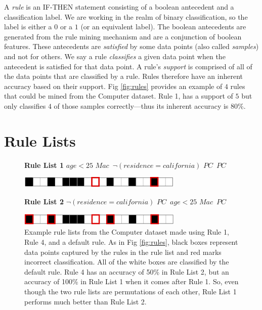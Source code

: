 A \textit{rule} is an IF-THEN statement consisting of a boolean antecedent and a classification label.
We are working in the realm of binary classification, so the label is either a $0$ or a $1$ (or an equivalent label).
The boolean antecedents are generated from the rule mining mechanism \cite{LethamRuMcMa15} and are a conjunction of boolean features.
These antecedents are \textit{satisfied} by some data points (also called \textit{samples}) and not for others.
We say a rule \textit{classifies} a given data point when the antecedent is satisfied for that data point.
A rule's \textit{support} is comprised of all of the data points that are classified by a rule.
Rules therefore have an inherent accuracy based on their support.
Fig \ref{fig:rules} provides an example of $4$ rules that could be mined from the Computer dataset.
Rule 1, has a support of $5$ but only classifies $4$ of those samples correctly---thus its inherent accuracy is $80$\%.

\section{Rule Lists}

\begin{figure}[t!]
\begin{algorithmic}
\normalsize

\State \textbf{Rule List 1}
\State \bif $age < 25$ \bthen $Mac$\,
\State \belif $\neg (residence=california)$ \bthen $PC$\,
\State \belse $PC$

\begin{raggedleft}
\vspace{1mm}
\includegraphics[width=0.7\textwidth]{figs/rule_list_1_cap.png}
\end{raggedleft}
\State \textbf{Rule List 2}
\State \bif $\neg (residence=california)$ \bthen $PC$\,
\State \belif $age < 25$ \bthen $Mac$\,
\State \belse $PC$

\begin{raggedleft}
\includegraphics[width=0.7\textwidth]{figs/rule_list_2_cap.png}
\end{raggedleft}

\end{algorithmic}
\caption{Example rule lists from the Computer dataset made using Rule 1, Rule 4, and a default rule.
As in Fig \ref{fig:rules}, black boxes represent data points captured by the rules in the rule list and red marks incorrect classification.
All of the white boxes are classified by the default rule.
Rule 4 has an accuracy of 50\% in Rule List 2, but an accuracy of 100\% in Rule List 1 when it comes after Rule 1.
So, even though the two rule lists are permutations of each other, Rule List 1 performs much better than Rule List 2.}
\label{fig:rule-list-computer}
\end{figure}

